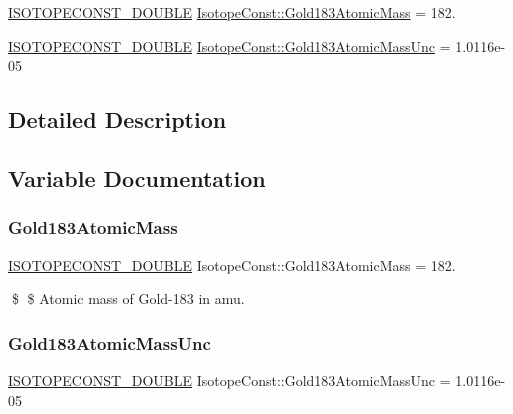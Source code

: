 \begin{DoxyCompactItemize}
\item 
\mbox{\hyperlink{group___isotope_const-_macros_ga8f45a7272ce02c0b4c65c44636ed719a}{I\+S\+O\+T\+O\+P\+E\+C\+O\+N\+S\+T\+\_\+\+D\+O\+U\+B\+LE}} \mbox{\hyperlink{group___isotope_const-_gold-_au183_gabdf8a14162c5796c7550f950b8e5d372}{Isotope\+Const\+::\+Gold183\+Atomic\+Mass}} = 182.
\item 
\mbox{\hyperlink{group___isotope_const-_macros_ga8f45a7272ce02c0b4c65c44636ed719a}{I\+S\+O\+T\+O\+P\+E\+C\+O\+N\+S\+T\+\_\+\+D\+O\+U\+B\+LE}} \mbox{\hyperlink{group___isotope_const-_gold-_au183_ga7452978b340f2dca4f70418187c20e2b}{Isotope\+Const\+::\+Gold183\+Atomic\+Mass\+Unc}} = 1.\+0116e-\/05
\end{DoxyCompactItemize}


\subsection{Detailed Description}


\subsection{Variable Documentation}
\mbox{\label{group___isotope_const-_gold-_au183_gabdf8a14162c5796c7550f950b8e5d372}} 
\subsubsection{\texorpdfstring{Gold183\+Atomic\+Mass}{Gold183AtomicMass}}
{\footnotesize\ttfamily \mbox{\hyperlink{group___isotope_const-_macros_ga8f45a7272ce02c0b4c65c44636ed719a}{I\+S\+O\+T\+O\+P\+E\+C\+O\+N\+S\+T\+\_\+\+D\+O\+U\+B\+LE}} Isotope\+Const\+::\+Gold183\+Atomic\+Mass = 182.}

\$ \$ Atomic mass of Gold-\/183 in amu. \mbox{\label{group___isotope_const-_gold-_au183_ga7452978b340f2dca4f70418187c20e2b}} 
\subsubsection{\texorpdfstring{Gold183\+Atomic\+Mass\+Unc}{Gold183AtomicMassUnc}}
{\footnotesize\ttfamily \mbox{\hyperlink{group___isotope_const-_macros_ga8f45a7272ce02c0b4c65c44636ed719a}{I\+S\+O\+T\+O\+P\+E\+C\+O\+N\+S\+T\+\_\+\+D\+O\+U\+B\+LE}} Isotope\+Const\+::\+Gold183\+Atomic\+Mass\+Unc = 1.\+0116e-\/05}


